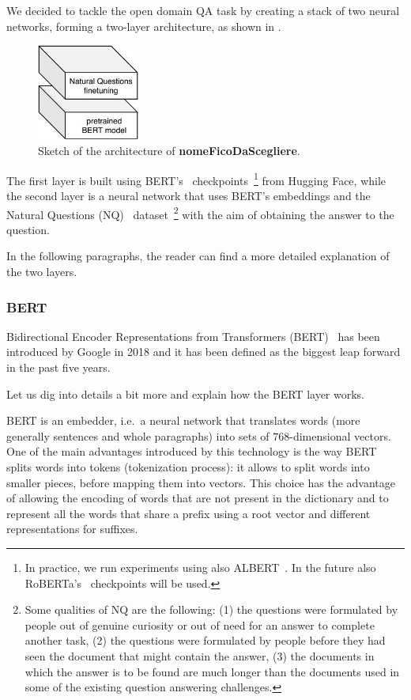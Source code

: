 \documentclass[10pt,hidelinks]{article}
\newcommand{\nomefico}{\textbf{nomeFicoDaScegliere}}
\begin{document}
We decided to tackle the open domain QA task by creating a stack of two neural networks, forming a two-layer architecture, as shown in .

\begin{figure}[ht!]
    \centering
    \includegraphics[width=0.3\textwidth]{pics/broad_architecture.pdf}
    \caption{Sketch of the architecture of \nomefico.}\label{fig:broad_architecture}
\end{figure}

The first layer is built using BERT's~\cite{devlin2018bert} checkpoints~\footnote{In practice, we run experiments using also ALBERT~\cite{albert}. In the future also RoBERTa's~\cite{roberta} checkpoints will be used.} from Hugging Face, while the second layer is a neural network that uses BERT's embeddings and the Natural Questions (NQ)~\cite{kwiatowski} dataset~\footnote{Some qualities of NQ are the following: (1) the questions were formulated by people out of genuine curiosity or out of need for an answer to complete another task, (2) the questions were formulated by people before they had seen the document that might contain the answer, (3) the documents in which the answer is to be found are much longer than the documents used in some of the existing question answering challenges.} with the aim of obtaining the answer to the question.

In the following paragraphs, the reader can find a more detailed explanation of the two layers.

\subsubsection{BERT}\label{subsubsec:bert}
Bidirectional Encoder Representations from Transformers (BERT)~\cite{devlin2018bert}  has been introduced by Google in 2018 and it has been defined as the biggest leap forward in the past five years.

Let us dig into details a bit more and explain how the BERT layer works.

BERT is an embedder, i.e.~a neural network that translates words (more generally sentences and whole paragraphs) into sets of $768$-dimensional vectors.
One of the main advantages introduced by this technology is the way BERT splits words into tokens (tokenization process): it allows to split words into smaller pieces, before mapping them into vectors.
This choice has the advantage of allowing the encoding of words that are not present in the dictionary and to represent all the words that share a prefix using a root vector and different representations for suffixes.
\end{document}
